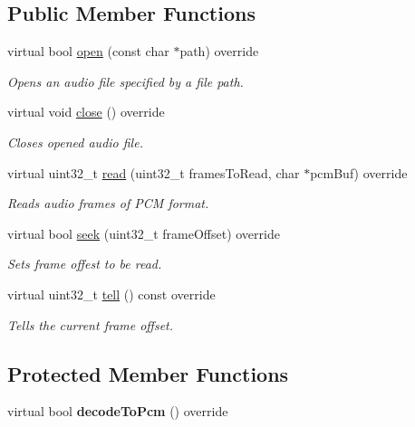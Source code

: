 \subsection*{Public Member Functions}
\begin{DoxyCompactItemize}
\item 
virtual bool \hyperlink{classcocos2d_1_1experimental_1_1AudioDecoderOgg_a7df966c2d88ddefe6fb4a49b8a1ceabb}{open} (const char $\ast$path) override
\begin{DoxyCompactList}\small\item\em Opens an audio file specified by a file path. \end{DoxyCompactList}\item 
virtual void \hyperlink{classcocos2d_1_1experimental_1_1AudioDecoderOgg_abca712fe6031eaebf98f6ac7eef64b0e}{close} () override
\begin{DoxyCompactList}\small\item\em Closes opened audio file. \end{DoxyCompactList}\item 
virtual uint32\+\_\+t \hyperlink{classcocos2d_1_1experimental_1_1AudioDecoderOgg_ae0bc8e6b0efdf11ec12235c4095bb3b1}{read} (uint32\+\_\+t frames\+To\+Read, char $\ast$pcm\+Buf) override
\begin{DoxyCompactList}\small\item\em Reads audio frames of P\+CM format. \end{DoxyCompactList}\item 
virtual bool \hyperlink{classcocos2d_1_1experimental_1_1AudioDecoderOgg_ae9baafa8fb2c6f887462be0cfd1388a6}{seek} (uint32\+\_\+t frame\+Offset) override
\begin{DoxyCompactList}\small\item\em Sets frame offest to be read. \end{DoxyCompactList}\item 
virtual uint32\+\_\+t \hyperlink{classcocos2d_1_1experimental_1_1AudioDecoderOgg_a4b0c16bf9b5f4ca1fda2752a353b836a}{tell} () const override
\begin{DoxyCompactList}\small\item\em Tells the current frame offset. \end{DoxyCompactList}\end{DoxyCompactItemize}
\subsection*{Protected Member Functions}
\begin{DoxyCompactItemize}
\item 
\mbox{\label{classcocos2d_1_1experimental_1_1AudioDecoderOgg_a96826c0634cd88024a6dccaa6e2b1e9f}} 
virtual bool {\bfseries decode\+To\+Pcm} () override
\end{DoxyCompactItemize}

